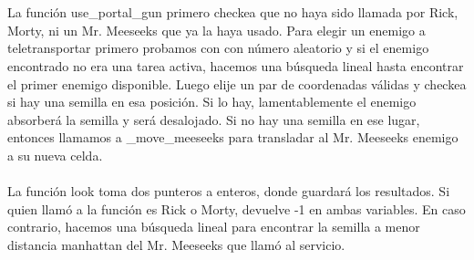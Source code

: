 \\\\
La función use_portal_gun primero checkea que no haya sido llamada por Rick, Morty, ni un Mr. Meeseeks que ya la haya usado. Para elegir un enemigo a teletransportar primero probamos con con número aleatorio y si el enemigo encontrado no era una tarea activa, hacemos una búsqueda lineal hasta encontrar el primer enemigo disponible. Luego elije un par de coordenadas válidas y checkea si hay una semilla en esa posición. Si lo hay, lamentablemente el enemigo absorberá la semilla y será desalojado. Si no hay una semilla en ese lugar, entonces llamamos a _move_meeseeks para transladar al Mr. Meeseeks enemigo a su nueva celda.
\\\\
La función look toma dos punteros a enteros, donde guardará los resultados. Si quien llamó a la función es Rick o Morty, devuelve -1 en ambas variables. En caso contrario, hacemos una búsqueda lineal para encontrar la semilla a menor distancia manhattan del Mr. Meeseeks que llamó al servicio.
